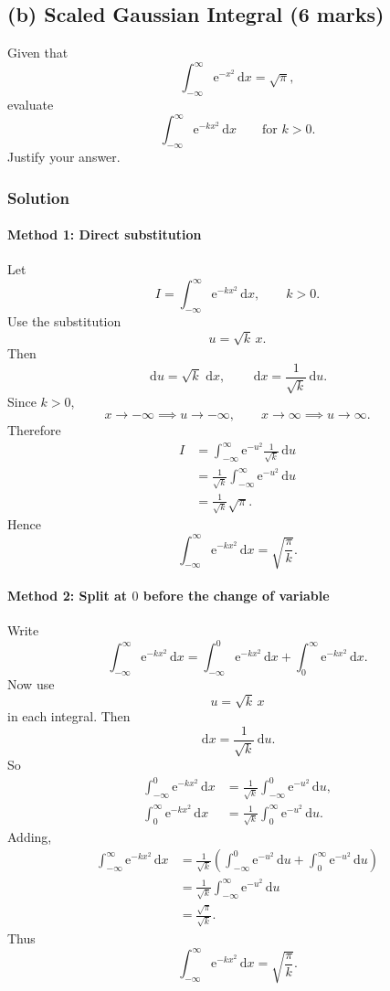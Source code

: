 \documentclass[12pt]{article}
\newcommand{\dd}{\,\mathrm{d}}
\newcommand{\ee}{\mathrm{e}}
\begin{document}
\subsection{(b) Scaled Gaussian Integral \hfill (6 marks)}

Given that
\[
\int_{-\infty}^{\infty}\ee^{-x^2}\dd x=\sqrt{\pi},
\]
evaluate
\[
\int_{-\infty}^{\infty}\ee^{-kx^2}\dd x
\qquad \text{for } k>0.
\]
Justify your answer.

\subsubsection{Solution}
\paragraph{Method 1: Direct substitution}
Let
\[
I=\int_{-\infty}^{\infty}\ee^{-kx^2}\dd x,
\qquad k>0.
\]
Use the substitution
\[
u=\sqrt{k}\,x.
\]
Then
\[
\dd u=\sqrt{k}\,\dd x,
\qquad
\dd x=\frac{1}{\sqrt{k}}\dd u.
\]
Since \(k>0\),
\[
x\to -\infty \implies u\to -\infty,
\qquad
x\to \infty \implies u\to \infty.
\]
Therefore
\begin{align*}
I
&=\int_{-\infty}^{\infty}\ee^{-u^2}\frac{1}{\sqrt{k}}\dd u \\
&=\frac{1}{\sqrt{k}}\int_{-\infty}^{\infty}\ee^{-u^2}\dd u \\
&=\frac{1}{\sqrt{k}}\sqrt{\pi}.
\end{align*}
Hence
\[
\boxed{\int_{-\infty}^{\infty}\ee^{-kx^2}\dd x=\sqrt{\frac{\pi}{k}}.}
\]

\newpage
\paragraph{Method 2: Split at \(0\) before the change of variable}
Write
\[
\int_{-\infty}^{\infty}\ee^{-kx^2}\dd x
=
\int_{-\infty}^{0}\ee^{-kx^2}\dd x
+
\int_{0}^{\infty}\ee^{-kx^2}\dd x.
\]
Now use
\[
u=\sqrt{k}\,x
\]
in each integral. Then
\[
\dd x=\frac{1}{\sqrt{k}}\dd u.
\]
So
\begin{align*}
\int_{-\infty}^{0}\ee^{-kx^2}\dd x
&=\frac{1}{\sqrt{k}}\int_{-\infty}^{0}\ee^{-u^2}\dd u,\\
\int_{0}^{\infty}\ee^{-kx^2}\dd x
&=\frac{1}{\sqrt{k}}\int_{0}^{\infty}\ee^{-u^2}\dd u.
\end{align*}
Adding,
\begin{align*}
\int_{-\infty}^{\infty}\ee^{-kx^2}\dd x
&=\frac{1}{\sqrt{k}}\left(\int_{-\infty}^{0}\ee^{-u^2}\dd u+\int_{0}^{\infty}\ee^{-u^2}\dd u\right) \\
&=\frac{1}{\sqrt{k}}\int_{-\infty}^{\infty}\ee^{-u^2}\dd u \\
&=\frac{\sqrt{\pi}}{\sqrt{k}}.
\end{align*}
Thus
\[
\boxed{\int_{-\infty}^{\infty}\ee^{-kx^2}\dd x=\sqrt{\frac{\pi}{k}}.}
\]
\end{document}
